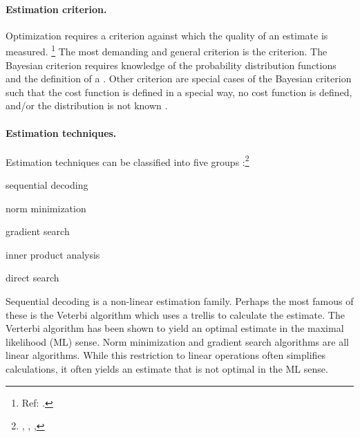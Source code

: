 \paragraph{Estimation criterion.}
Optimization requires a criterion against which the quality of an
estimate is measured.
\footnote{Ref: .}
The most demanding and general criterion is the  criterion.
The Bayesian criterion requires knowledge of the probability
distribution functions and the definition of a .
Other criterion are special cases of the Bayesian criterion
such that the cost function is defined in a special way,
no cost function is defined, and/or the distribution is not known 
.

\paragraph{Estimation techniques.}
\label{ref:sec:parameter-est}
Estimation techniques can be classified into 
five groups :\footnote{%
  ,
  ,
  ,
  }
\begin{enume}
   \item sequential decoding
   \item norm minimization
   \item gradient search
   \item inner product analysis
   \item direct search
\end{enume}

Sequential decoding is a non-linear estimation family.
Perhaps the most famous of these is the Veterbi algorithm which
uses a trellis to calculate the estimate.
The Verterbi algorithm has been shown to yield an optimal estimate
in the maximal likelihood (ML) sense.
Norm minimization and gradient search algorithms are all linear algorithms.
While this restriction to linear operations often simplifies calculations,
it often yields an estimate that is not optimal in the ML sense.

